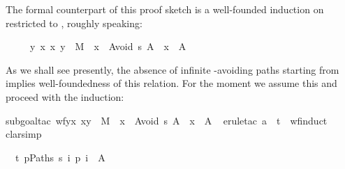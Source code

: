 \begin{isabellebody}
\begin{isamarkuptxt}
The formal counterpart of this proof sketch is a well-founded induction
on~ restricted to , roughly speaking:
\begin{isabelle}%
\ \ \ \ \ {}{}y{}\ x{}{}\ {}x{}\ y{}\ {}\ M\ {}\ x\ {}\ Avoid\ s\ A\ {}\ x\ {}\ A{}%
\end{isabelle}
As we shall see presently, the absence of infinite -avoiding paths
starting from  implies well-foundedness of this relation. For the
moment we assume this and proceed with the induction:%
\end{isamarkuptxt}%
\isamarkuptrue%
\isamarkupfalse%
{}subgoal{}tac\ {}wf{}{}y{}x{}{}\ {}x{}y{}\ {}\ M\ {}\ x\ {}\ Avoid\ s\ A\ {}\ x\ {}\ A{}{}{}\isanewline
\ \isamarkupfalse%
{}erule{}tac\ a\ {}\ t\ \ wf{}induct{}\isanewline
\ \isamarkupfalse%
{}clarsimp{}%
\begin{isamarkuptxt}%
\noindent
\begin{isabelle}%
\ {}{}\ {}t{}\ {}{}p{}Paths\ s{}\ {}i{}\ p\ i\ {}\ A{}\isanewline

\end{isabelle}
\end{isamarkuptxt}
\end{isabellebody}
